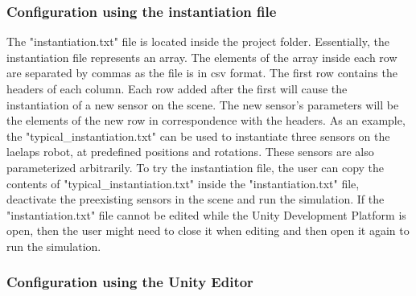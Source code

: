 \documentclass{article}
\begin{document}
\subsubsection{Configuration using the instantiation file}

The "instantiation.txt" file is located inside the project folder. Essentially, the instantiation file represents an array. The elements of the array inside each row are separated by commas as the file is in csv format. The first row contains the headers of each column. Each row added after the first will cause the instantiation of a new sensor on the scene. The new sensor's parameters will be the elements of the new row in correspondence with the headers. As an example, the "typical\_instantiation.txt" can be used to instantiate three sensors on the laelaps robot, at predefined positions and rotations. These sensors are also parameterized arbitrarily. To try the instantiation file, the user can copy the contents of "typical\_instantiation.txt" inside the "instantiation.txt" file, deactivate the preexisting sensors in the scene and run the simulation. If the "instantiation.txt" file cannot be edited while the Unity Development Platform is open, then the user might need to close it when editing and then open it again to run the simulation. 


\subsubsection{Configuration using the Unity Editor}
\end{document}
